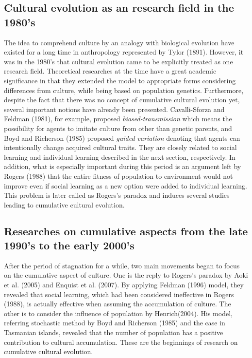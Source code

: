 \documentclass[a4paper, dvipdfmx]{article}
\begin{document}
\subsection*{Cultural evolution as an research field in the 1980's}
The idea to comprehend culture by an analogy with biological evolution have existed for a long time in anthropology represented by Tylor (1891). However, it was in the 1980's that cultural evolution came to be explicitly treated as one research field. Theoretical researches at the time have a great academic significance in that they extended the model to appropriate forms considering differences from culture, while being based on population genetics. Furthermore, despite the fact that there was no concept of cumulative cultural evolution yet, several important notions have already been presented. Cavalli-Sforza and Feldman (1981), for example, proposed {\it biased-transmission} which means the possibility for agents to imitate culture from other than genetic parents, and Boyd and Richerson (1985) proposed {\it guided variation} denoting that agents can intentionally change acquired cultural traits. They are closely related to social learning and individual learning described in the next section, respectively. In addition, what is especially important during this period is an argument left by Rogers (1988) that the entire fitness of population to environment would not improve even if social learning as a new option were added to individual learning. This problem is later called as Rogers's paradox and induces several studies leading to cumulative cultural evolution.

\subsection*{Researches on cumulative aspects from the late 1990's to the early 2000's}
After the period of stagnation for a while, two main movements began to focus on the cumulative aspect of culture. One is the reply to Rogers's paradox by Aoki et al. (2005) and Enquist et al. (2007). By applying Feldman (1996) model, they revealed that social learning, which had been considered ineffective in Rogers (1988), is actually effective when assuming the accumulation of culture. The other is to consider the influence of population by Henrich(2004). His model, referring stochastic method by Boyd and Richerson (1985) and the case in Tasmanian islands, revealed that the number of population has a positive contribution to cultural accumulation. These are the beginnings of research on cumulative cultural evolution.
\end{document}
